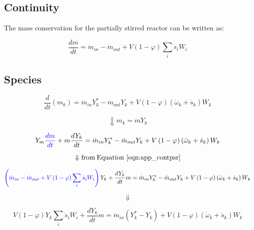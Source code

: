 \subsection{Continuity}
The mass conservation for the partially stirred reactor can be written as:

\begin{equation}
	\frac{dm}{dt}={\dot{m}}_{in}-{\dot{m}}_{out}+V\left(1-\varphi\right)\sum_{i}{{\dot{s}}_iW_i}
	\label{eqn:app_contpsr}
\end{equation}

\subsection{Species}


\begin{equation*}
	\frac{d}{dt}\left(m_k\right)={\dot{m}}_{in}Y_k^\ast-{\dot{m}}_{out}Y_k+V\left(1-\varphi\right)\left({\dot{\omega}}_k+{\dot{s}}_k\right)W_k
\end{equation*}

\begin{equation*}
	\Downarrow m_k=mY_k
\end{equation*}


\begin{equation*}
	Y_m
	\color{blue}
	\frac{dm}{dt}
	\color{black}
	+
	m\frac{dY_k}{dt}
	=
	{\dot{m}}_{in}Y_k^\ast-{\dot{m}}_{out}Y_k+V\left(1-\varphi\right)\left({\dot{\omega}}_k+{\dot{s}}_k\right)W_k
\end{equation*}

\begin{equation*}
	\Downarrow \mathrm{from \: Equation~\ref{eqn:app_contpsr}}
\end{equation*}


\begin{equation*}
	\color{blue}
	\left(
		{\dot{m}}_{in}
		-
		{\dot{m}}_{out}
		+V\left(1-\varphi\right)\sum_{i}{{\dot{s}}_iW_i}
	\right)
	\color{black}
	Y_k+\frac{dY_k}{dt}m={\dot{m}}_{in}Y_k^\ast-{\dot{m}}_{out}Y_k+V\left(1-\varphi\right)\left({\dot{\omega}}_k+{\dot{s}}_k\right)W_k
\end{equation*}

 \begin{equation*}
 	\Downarrow
 \end{equation*}


\begin{equation*}
	V\left(1-\varphi\right)Y_k\sum_{i}{{\dot{s}}_iW_i}
	+
	\frac{dY_k}{dt}m=
	{\dot{m}}_{in}
	\left(
		Y_k^\ast - Y_k
	\right)
	+
	V\left(1-\varphi\right)\left({\dot{\omega}}_k+{\dot{s}}_k\right)W_k
\end{equation*}

